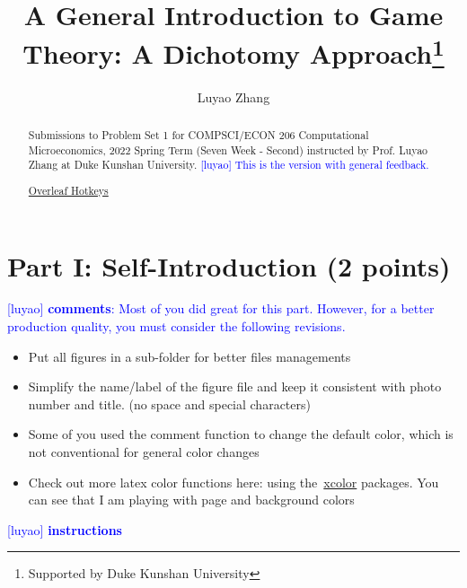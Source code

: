 \documentclass[runningheads]{llncs}
\newcommand{\luyao}[1]{\textcolor{blue}{[luyao] #1}}
\newcommand{\luyao}[1]{}
\begin{document}
%
\title{A General Introduction to Game Theory: A Dichotomy Approach\thanks{Supported by Duke Kunshan University}}
%
%
\author{Luyao Zhang}
%
%
%

\maketitle              %
%
\begin{abstract}
Submissions to Problem Set 1 for COMPSCI/ECON 206 Computational Microeconomics, 2022 Spring Term (Seven Week - Second) instructed by Prof. Luyao Zhang at Duke Kunshan University. \luyao{This is the version with general feedback.}
\par
\href{https://www.overleaf.com/learn/how-to/Hotkeys}{Overleaf Hotkeys}


\end{abstract}
%
%
%
\section{Part I: Self-Introduction (2 points)}
\luyao{\textbf{comments}: Most of you did great for this part. However, for a better production quality, you must consider the following revisions.} 
\begin{itemize}
    \item Put all figures in a sub-folder for better files managements
    \item Simplify the name/label of the figure file and keep it consistent with photo number and title. (no space and special characters)
    \item Some of you used the comment function to change the default color, which is not conventional for general color changes
    \item Check out more latex color functions here: using the~\href{https://www.overleaf.com/learn/latex/Using_colours_in_LaTeX}{xcolor} packages. You can see that I am playing with page and background colors
\end{itemize}
\noindent\luyao{\textbf{instructions}}
\end{document}
